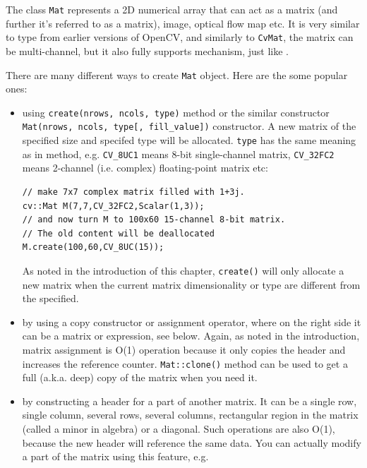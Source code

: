 The class \texttt{Mat} represents a 2D numerical array that can act as a matrix (and further it's referred to as a matrix), image, optical flow map etc. It is very similar to  type from earlier versions of OpenCV, and similarly to \texttt{CvMat}, the matrix can be multi-channel, but it also fully supports  mechanism, just like .

There are many different ways to create \texttt{Mat} object. Here are the some popular ones:
\begin{itemize}
\item using \texttt{create(nrows, ncols, type)} method or
    the similar constructor \texttt{Mat(nrows, ncols, type[, fill\_value])} constructor.
    A new matrix of the specified size and specifed type will be allocated.
    \texttt{type} has the same meaning as in  method,
    e.g. \texttt{CV\_8UC1} means 8-bit single-channel matrix,
    \texttt{CV\_32FC2} means 2-channel (i.e. complex) floating-point matrix etc:
        
\begin{lstlisting}
// make 7x7 complex matrix filled with 1+3j.
cv::Mat M(7,7,CV_32FC2,Scalar(1,3));
// and now turn M to 100x60 15-channel 8-bit matrix.
// The old content will be deallocated
M.create(100,60,CV_8UC(15));
\end{lstlisting}
        
    As noted in the introduction of this chapter, \texttt{create()}
    will only allocate a new matrix when the current matrix dimensionality
    or type are different from the specified.
        
\item by using a copy constructor or assignment operator, where on the right side it can
      be a matrix or expression, see below. Again, as noted in the introduction,
      matrix assignment is O(1) operation because it only copies the header
      and increases the reference counter. \texttt{Mat::clone()} method can be used to get a full
      (a.k.a. deep) copy of the matrix when you need it.
          
\item by constructing a header for a part of another matrix. It can be a single row, single column,
      several rows, several columns, rectangular region in the matrix (called a minor in algebra) or
      a diagonal. Such operations are also O(1), because the new header will reference the same data.
      You can actually modify a part of the matrix using this feature, e.g.
          

\end{itemize}
